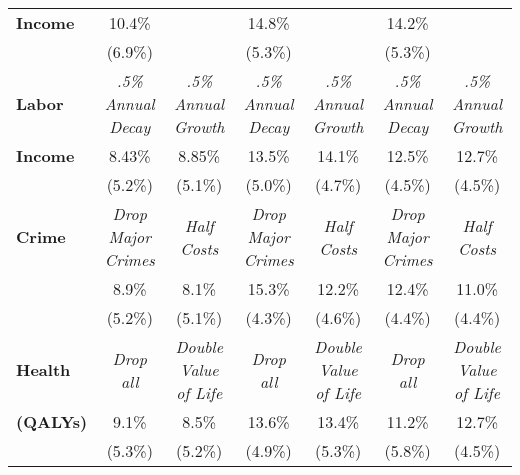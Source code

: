 \begin{tabular}{>{\bfseries}lcccccc}
Income	&	10.4\%	&		&	14.8\%	&		&	14.2\%	&		\\
	&	(6.9\%)	&		&	(5.3\%) &		&	(5.3\%)	&		\\ \midrule
Labor	&	\textit{.5\% Annual Decay}	&	\textit{.5\% Annual Growth}	&	\textit{.5\% Annual Decay}	&	\textit{.5\% Annual Growth}	&	\textit{.5\% Annual Decay}	&	\textit{.5\% Annual Growth}	\\
Income	&	8.43\%	&	8.85\%	&	13.5\%	&	14.1\%	&	12.5\%	&	12.7\%	\\
	&	(5.2\%)	&	(5.1\%)	&	(5.0\%) &	(4.7\%)	&	(4.5\%)	&	(4.5\%)	\\ \midrule
Crime	&	\textit{Drop Major Crimes}	&	\textit{Half Costs}	&	\textit{Drop Major Crimes}	&	\textit{Half Costs}	&	\textit{Drop Major Crimes}	&	\textit{Half Costs}	\\
	&	8.9\%	&	8.1\%	&	15.3\%	&	12.2\%	&	12.4\%	&	11.0\%	\\
	&	(5.2\%)	&	(5.1\%)	&	(4.3\%)	&	(4.6\%)	&	(4.4\%)	&	(4.4\%)	\\ \midrule
Health	&	\textit{Drop all}	&	\textit{Double Value of Life}	&	\textit{Drop all}	&	\textit{Double Value of Life}	&	\textit{Drop all}	&	\textit{Double Value of Life}	\\
(QALYs)	&	9.1\%	&	8.5\%	&	13.6\%	&	13.4\%	&	11.2\%	&	12.7\%	\\
	&	(5.3\%)	&	(5.2\%)	&	(4.9\%)	&	(5.3\%)	&	(5.8\%)	&	(4.5\%)	\\ \bottomrule
\end{tabular}